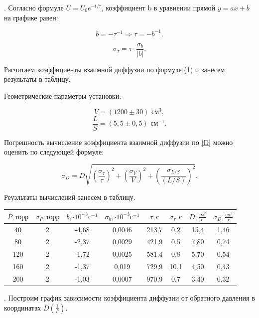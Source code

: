 \documentclass[a4paper,12pt]{article} %
\begin{document}
. Согласно формуле $U = U_0e^{-t/\tau}$, коэффициент b в уравнении прямой $y = ax + b$ на графике равен: 

\[ b = -\tau^{-1} \Rightarrow \tau = -b^{-1}. \]

\[ \sigma_\tau = \tau \cdot \frac{\sigma_{b}}{|b|}. \]

\noindent Расчитаем коэффициенты взаимной диффузии по формуле (1) и занесем результаты в таблицу. 

\medskip

\noindent Геометрические параметры установки:

\[ V = (1200\pm 30) \text{ см}^3,\] \[ \frac{L}{S} = (5,5 \pm 0,5) \text{ см}^{-1}. \]

\noindent Погрешность вычисление коэффициента взаимной диффузии по \eqref{D} можно оценить по следующей формуле:

\[ \sigma_D = D\sqrt{\left(\frac{\sigma_\tau}{\tau}\right)^2+\left(\frac{\sigma_V}{V}\right)^2+\left(\frac{\sigma_{L/S}}{(L/S)}\right)^2}. \]

\noindent Реузльтаты вычислений занесем в таблицу.

\medskip

\begin{tabular}{|c|c|c|c|c|c|c|c|}
\hline 
$P, \text{торр}$ & $\sigma_P, \text{торр}$ & $b, \cdot 10^{-3} {\text{с}}^{-1}$ & $\sigma_b, \cdot 10^{-3} {\text{с}}^{-1}$ & $\tau, \text{с}$ & $\sigma_\tau, \text{с}$ & $D, \frac{{\text{см}}^2}{\text{c}}$ & $\sigma_D, \frac{{\text{см}}^2}{\text{c}}$ \\ 
\hline 
40 & 2 & -4,68 & 0,0046 & 213,7 & 0,2 & 15,4 & 1,46 \\ 
\hline 
80 & 2 & -2,37 & 0,0029 & 421,9 & 0,5 & 7,80 & 0,74 \\ 
\hline 
120 & 2 & -1,72 & 0,0025 & 581,4 & 0,8 & 5,70 & 0,54 \\ 
\hline 
160 & 2 & -1,37 & 0,019 & 729,9 & 10,1 & 4,50 & 0,43 \\ 
\hline 
200 & 2 & -1,03 & 0,0007 & 970,9 & 0,7 & 3,40 & 0,32 \\ 
\hline 
\end{tabular} 

\medskip

. Построим график зависимости коэффициента диффузии от обратного давления в координатах $D(\frac{1}{P})$. 
\end{document}
